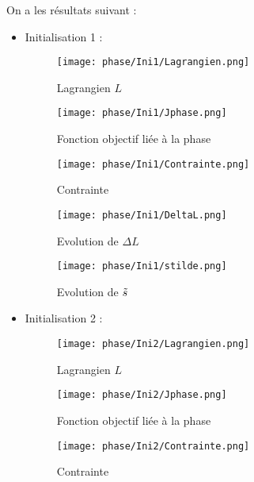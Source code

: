 \documentclass[11pt,a4paper]{article}
\begin{document}
On a les résultats suivant :

\begin{itemize}
	\item Initialisation 1 :
	
	\begin{figure}[H]
		\begin{minipage}{0.33\textwidth}
			\centering
			\texttt{[image: phase/Ini1/Lagrangien.png]}
			\caption{Lagrangien $L$}
		\end{minipage}
		\begin{minipage}{0.33\textwidth}
			\centering
			\texttt{[image: phase/Ini1/Jphase.png]}
			\caption{Fonction objectif liée à la phase}
		\end{minipage}
		\begin{minipage}{0.33\textwidth}
			\centering
			\texttt{[image: phase/Ini1/Contrainte.png]}
			\caption{Contrainte}
		\end{minipage}
	\end{figure}
	
	\begin{figure}[H]
		\begin{minipage}{0.45\textwidth}
			\centering
			\texttt{[image: phase/Ini1/DeltaL.png]}
			\caption{Evolution de $\Delta L$}
		\end{minipage}
		\begin{minipage}{0.45\textwidth}
			\centering
			\texttt{[image: phase/Ini1/stilde.png]}
			\caption{Evolution de $\tilde{s}$}
		\end{minipage}
	\end{figure}
	
	\item Initialisation 2 :
	
	\begin{figure}[H]
		\begin{minipage}{0.33\textwidth}
			\centering
			\texttt{[image: phase/Ini2/Lagrangien.png]}
			\caption{Lagrangien $L$}
		\end{minipage}
		\begin{minipage}{0.33\textwidth}
			\centering
			\texttt{[image: phase/Ini2/Jphase.png]}
			\caption{Fonction objectif liée à la phase}
		\end{minipage}
		\begin{minipage}{0.33\textwidth}
			\centering
			\texttt{[image: phase/Ini2/Contrainte.png]}
			\caption{Contrainte}
		\end{minipage}
	\end{figure}
	

\end{itemize}
\end{document}
